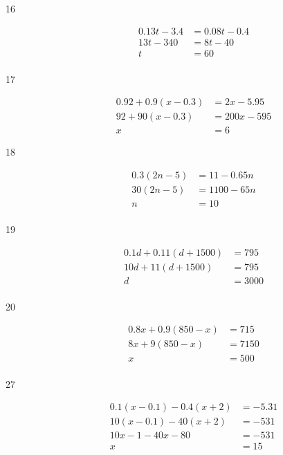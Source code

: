 \documentclass[letterpaper, landscape]{exam}
\begin{document}
\begin{description}
      \item[16]
        \begin{align*}
          0.13t - 3.4      & = 0.08t - 0.4 \\
          13t - 340        & = 8t - 40 \\
          t                & = \boxed{ 60 } \\
        \end{align*}

      \item[17]
        \begin{align*}
          0.92 + 0.9(x - 0.3)      & = 2x - 5.95 \\
          92 + 90(x - 0.3)         & = 200x - 595 \\
          x                        & = \boxed{ 6 }
        \end{align*}

      \item[18]
        \begin{align*}
          0.3(2n - 5) & = 11 - 0.65n \\
          30(2n - 5)  & = 1100 - 65n \\
          n           & = \boxed{ 10 } \\
        \end{align*}

      \item[19]
        \begin{align*}
          0.1d + 0.11 (d + 1500) & = 795 \\
          10d + 11 (d + 1500)    & = 795 \\
          d                      & = \boxed{ 3000 } \\
        \end{align*}

      \item[20]
        \begin{align*}
          0.8x + 0.9 (850 - x) & = 715 \\
          8x + 9(850 - x)      & = 7150 \\
          x                    & = \boxed{ 500 } \\
        \end{align*}

      \item[27]
        \begin{align*}
          0.1 (x - 0.1) - 0.4(x + 2) & = -5.31 \\
          10(x - 0.1) - 40(x + 2)    & = -531 \\
          10x - 1 - 40x - 80         & = -531 \\
          x                          & = \boxed{ 15 } \\
        \end{align*}


\end{description}
\end{document}
